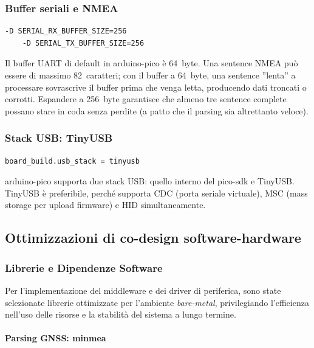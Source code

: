 \subsubsection*{Buffer seriali e NMEA}

\begin{lstlisting}[style=ini]
	-D SERIAL_RX_BUFFER_SIZE=256
	-D SERIAL_TX_BUFFER_SIZE=256
\end{lstlisting}

Il buffer UART di default in arduino-pico è 64~byte. Una sentence NMEA può essere di massimo 82~caratteri; con il buffer a 64~byte, una sentence ''lenta'' a processare sovrascrive il buffer prima che venga letta, producendo dati troncati o corrotti. Espandere a 256~byte garantisce che almeno tre sentence complete possano stare in coda senza perdite (a patto che il parsing sia altrettanto veloce).

\subsubsection*{Stack USB: TinyUSB}

\begin{lstlisting}[style=ini]
	board_build.usb_stack = tinyusb
\end{lstlisting}

arduino-pico supporta due stack USB: quello interno del pico-sdk e TinyUSB.
TinyUSB è preferibile, perché supporta CDC (porta seriale virtuale), MSC (mass storage per upload firmware) e HID simultaneamente.



\subsection{Ottimizzazioni di co-design software-hardware}

\subsubsection*{Librerie e Dipendenze Software}

Per l'implementazione del middleware e dei driver di periferica, sono state selezionate librerie ottimizzate per l'ambiente \textit{bare-metal}, privilegiando l'efficienza nell'uso delle risorse e la stabilità del sistema a lungo termine.

\paragraph{Parsing GNSS: minmea}

